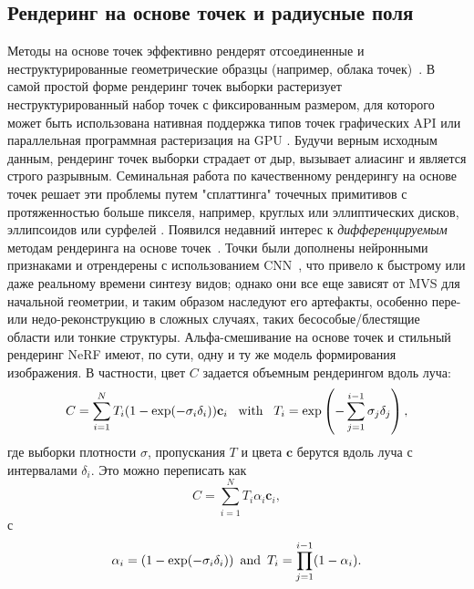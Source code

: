 \subsection{Рендеринг на основе точек и радиусные поля}
Методы на основе точек эффективно рендерят отсоединенные и неструктурированные геометрические образцы (например, облака точек)~\cite{gross2011point}. 
В самой простой форме рендеринг точек выборки \cite{Grossman1998PointSR} растеризует неструктурированный набор точек с фиксированным размером, для которого может быть использована нативная поддержка типов точек графических API \cite{SAINZ2004869} или параллельная программная растеризация на GPU \cite{10.1145/3543863, laine2011high}. Будучи верным исходным данным, рендеринг точек выборки страдает от дыр, вызывает алиасинг и является строго разрывным. Семинальная работа по качественному рендерингу на основе точек решает эти проблемы путем "сплаттинга" точечных примитивов с протяженностью больше пикселя, например, круглых или эллиптических дисков, эллипсоидов или сурфелей \cite{10.1145/383259.383300, 10.5555/2386366.2386369, Ren2002ObjectSE, 10.1145/344779.344936}.
Появился недавний интерес к \emph{дифференцируемым} методам рендеринга на основе точек~\cite{yifan19,wiles2020synsin}. Точки были дополнены нейронными признаками и отрендерены с использованием CNN~\cite{ruckert22,aliev20}, что привело к быстрому или даже реальному времени синтезу видов; однако они все еще зависят от MVS для начальной геометрии, и таким образом наследуют его артефакты, особенно пере- или недо-реконструкцию в сложных случаях, таких  бесособые/блестящие области или тонкие структуры. 
Альфа-смешивание на основе точек и стильный рендеринг NeRF имеют, по сути, одну и ту же модель формирования изображения.
В частности, цвет $C$ задается объемным рендерингом вдоль луча:
\begin{equation}
    \label{eq:nerf-rendering-quadrature}
    C = \sum_{i=1}^N T_i(1-\exp(-\sigma_i\delta_i))\mathbf{c}_i \hspace{0.5em} \text{ with } \hspace{0.5em} T_i = \exp\left(-\sum_{j=1}^{i-1}\sigma_j\delta_j\right),
\end{equation}
где выборки плотности $\sigma$, пропускания $T$ и цвета $\mathbf{c}$ берутся вдоль луча с интервалами $\delta_i$.
Это можно переписать как
\begin{equation}
    \label{eq:nerf-rendering-quadrature2}
    C = \sum_{i=1}^N T_i\alpha_i\mathbf{c}_i,
\end{equation}
с
\begin{equation*}
    \alpha_i = (1-\exp(-\sigma_i\delta_i)) 
    \hspace{0.5em} \text{and} \hspace{0.5em}
    T_i = \prod_{j=1}^{i-1}(1-\alpha_i).
\end{equation*}
